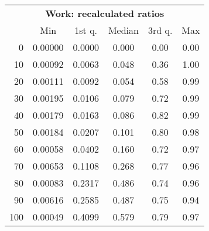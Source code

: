 \begin{tabular}{r|ccccc}
  \multicolumn{6}{c}{{\bf Work: recalculated ratios}} \\
  & Min & 1st q. & Median & 3rd q. & Max \\ \hline\hline
  0 & 0.00000 & 0.0000 & 0.000 & 0.00 & 0.00
\\ 10 & 0.00092 & 0.0063 & 0.048 & 0.36 & 1.00
\\ 20 & 0.00111 & 0.0092 & 0.054 & 0.58 & 0.99
\\ 30 & 0.00195 & 0.0106 & 0.079 & 0.72 & 0.99
\\ 40 & 0.00179 & 0.0163 & 0.086 & 0.82 & 0.99
\\ 50 & 0.00184 & 0.0207 & 0.101 & 0.80 & 0.98
\\ 60 & 0.00058 & 0.0402 & 0.160 & 0.72 & 0.97
\\ 70 & 0.00653 & 0.1108 & 0.268 & 0.77 & 0.96
\\ 80 & 0.00083 & 0.2317 & 0.486 & 0.74 & 0.96
\\ 90 & 0.00616 & 0.2585 & 0.487 & 0.75 & 0.94
\\ 100 & 0.00049 & 0.4099 & 0.579 & 0.79 & 0.97
\end{tabular}
